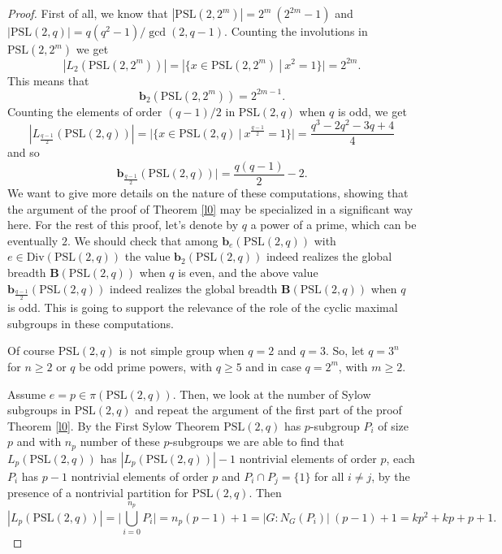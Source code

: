 \documentclass{amsart}
\theoremstyle{definition}
\numberwithin{equation}{section}
\begin{document}
\begin{proof}First of all, we know that $|\mathrm{PSL}(2,2^m)|=2^m \ (2^{2m}-1)$ and $|\mathrm{PSL}(2,q)|=q(q^2-1)/\gcd(2,q-1)$. Counting the involutions in $\mathrm{PSL}(2,2^m)$ we get \begin{equation}|L_2(\mathrm{PSL}(2,2^m))|=|\{x \in \mathrm{PSL}(2,2^m) \ | \ x^2=1\}|=2^{2m}.
\end{equation} This means that \begin{equation}\mathbf{b}_2(\mathrm{PSL}(2,2^m))=2^{2m-1}.
\end{equation}
Counting the elements of order $(q-1)/2$ in $\mathrm{PSL}(2,q)$ when $q$ is odd, we get
\begin{equation}|L_{\frac{q-1}{2}}(\mathrm{PSL}(2,q))|=|\{x \in \mathrm{PSL}(2,q) \ | \ x^{\frac{q-1}{2}}=1\}|=\frac{q^3-2q^2-3q+4}{4}
\end{equation}
and so \begin{equation}\mathbf{b}_\frac{q-1}{2}(\mathrm{PSL}(2,q))|=\frac{q(q-1)}{2}-2.
\end{equation}
We want to give more details on the nature of these computations, showing that the argument of the proof of Theorem \ref{l0} may be specialized in a significant way here. For the rest of this proof, let's denote by $q$ a power of a prime, which can be eventually $2$. We should check that among $\mathbf{b}_e(\mathrm{PSL}(2,q))$ with $e \in \mathrm{Div}(\mathrm{PSL}(2,q))$ the value $\mathbf{b}_2(\mathrm{PSL}(2,q))$ indeed realizes the global breadth $\mathbf{B}(\mathrm{PSL}(2,q))$ when $q$ is even, and the above value $\mathbf{b}_\frac{q-1}{2}(\mathrm{PSL}(2,q))$ indeed realizes the global breadth $\mathbf{B}(\mathrm{PSL}(2,q))$ when $q$ is odd.  This is going to support the relevance of the role of the cyclic maximal subgroups in these computations.


Of course $\mathrm{PSL}(2,q)$ is not simple group when $q=2$ and $q=3$. So, let $q=3^n$ for $n \ge 2$ or $q$ be odd prime powers, with $q \ge 5$ and in case $q=2^m$, with $m \ge 2$.  

Assume $e=p \in \pi(\mathrm{PSL}(2,q))$. Then, we look at the number of Sylow subgroups in $\mathrm{PSL}(2,q)$ and repeat the argument of the first part of the proof Theorem \ref{l0}. By the First Sylow Theorem $\mathrm{PSL}(2,q)$ has $p$-subgroup $P_i$ of size $p$ and with $n_p$  number of these $p$-subgroups we are able to find that $L_p(\mathrm{PSL}(2,q))$ has $|L_p(\mathrm{PSL}(2,q))|-1$ nontrivial elements of order $p$, each $P_i$ has $p-1$ nontrivial elements of order $p$ and $P_i\cap P_j=\{1\}$ for all $i\ne j$, by the presence of a nontrivial partition for $\mathrm{PSL}(2,q)$.  Then 
\begin{equation} \label{np}
|L_p(\mathrm{PSL}(2,q))|= \Big|\bigcup_{i=0}^{n_p}P_i \Big|= n_p(p-1)+1= |G : N_G(P_i)| \ (p-1)+1=kp^2+kp+p+1.
\end{equation}


\end{proof}
\end{document}
